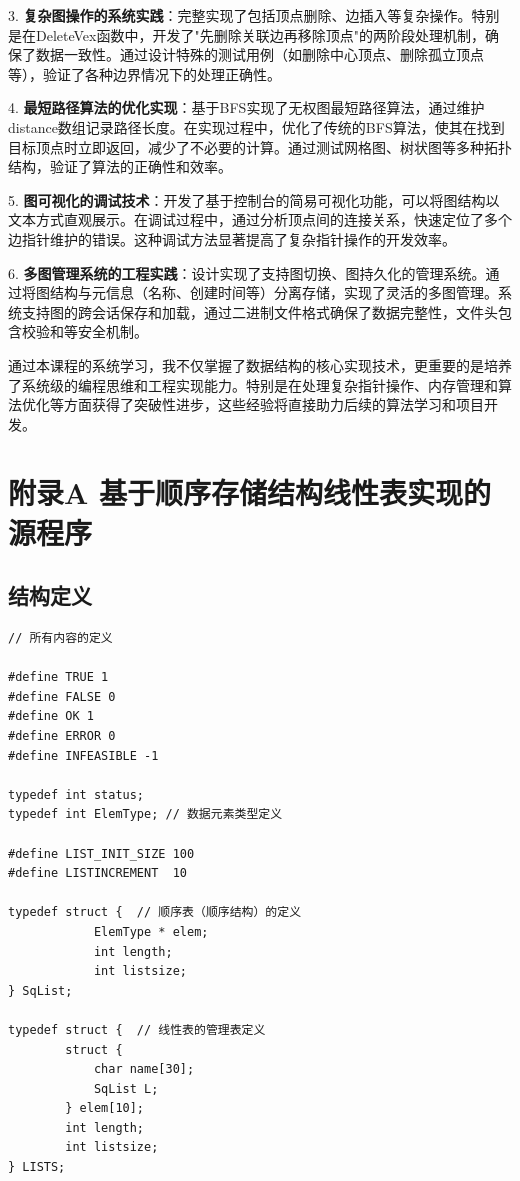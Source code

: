 \documentclass[supercite]{Experimental_Report}
\theoremstyle{definition}
\begin{document}
3. \textbf{复杂图操作的系统实践}：完整实现了包括顶点删除、边插入等复杂操作。特别是在DeleteVex函数中，开发了"先删除关联边再移除顶点"的两阶段处理机制，确保了数据一致性。通过设计特殊的测试用例（如删除中心顶点、删除孤立顶点等），验证了各种边界情况下的处理正确性。

4. \textbf{最短路径算法的优化实现}：基于BFS实现了无权图最短路径算法，通过维护distance数组记录路径长度。在实现过程中，优化了传统的BFS算法，使其在找到目标顶点时立即返回，减少了不必要的计算。通过测试网格图、树状图等多种拓扑结构，验证了算法的正确性和效率。

5. \textbf{图可视化的调试技术}：开发了基于控制台的简易可视化功能，可以将图结构以文本方式直观展示。在调试过程中，通过分析顶点间的连接关系，快速定位了多个边指针维护的错误。这种调试方法显著提高了复杂指针操作的开发效率。

6. \textbf{多图管理系统的工程实践}：设计实现了支持图切换、图持久化的管理系统。通过将图结构与元信息（名称、创建时间等）分离存储，实现了灵活的多图管理。系统支持图的跨会话保存和加载，通过二进制文件格式确保了数据完整性，文件头包含校验和等安全机制。

通过本课程的系统学习，我不仅掌握了数据结构的核心实现技术，更重要的是培养了系统级的编程思维和工程实现能力。特别是在处理复杂指针操作、内存管理和算法优化等方面获得了突破性进步，这些经验将直接助力后续的算法学习和项目开发。


\nocite{*} %



\setcounter{secnumdepth}{0}
\appendix

\section{附录A 基于顺序存储结构线性表实现的源程序}

\subsection{结构定义}
\begin{lstlisting}
// 所有内容的定义

#define TRUE 1
#define FALSE 0
#define OK 1
#define ERROR 0
#define INFEASIBLE -1

typedef int status;
typedef int ElemType; // 数据元素类型定义

#define LIST_INIT_SIZE 100
#define LISTINCREMENT  10

typedef struct {  // 顺序表（顺序结构）的定义
            ElemType * elem;
            int length;
            int listsize;
} SqList;

typedef struct {  // 线性表的管理表定义
        struct { 
            char name[30];
            SqList L;	
        } elem[10];
        int length;
        int listsize;
} LISTS;

\end{lstlisting}
\end{document}
